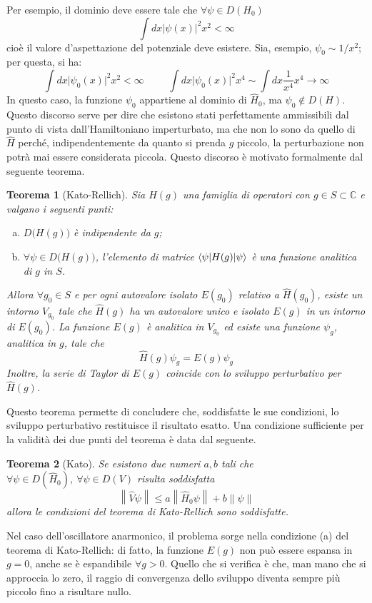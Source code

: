 \documentclass[11pt, a4paper]{scrartcl} %
\numberwithin{equation}{section}
\theoremstyle{style2}
\theoremstyle{style1}
\newtheorem{teorema}{Teorema}[section]
\begin{document}
Per esempio, il dominio deve essere tale che $\forall \psi \in D(H_0)$
\[
\int dx \lvert \psi (x) \rvert ^2 x^2 < \infty
\] 
cio\`e il valore d'aspettazione del potenziale deve esistere.
Sia, esempio, $\psi _0\sim 1 / x^2$; per questa, si ha:
\[
\int dx \lvert \psi _0(x) \rvert ^2 x^2 < \infty \hspace{1cm} \int dx \lvert \psi _0(x) \rvert ^2 x^4 \sim \int dx \frac{1}{x^4} x^4 \to \infty
\] 
In questo caso, la funzione $\psi _0$ appartiene al dominio di $\hat{H}_0$, ma $\psi _0 \not \in D(H)$.
Questo discorso serve per dire che esistono stati perfettamente ammissibili dal punto di vista dall'Hamiltoniano imperturbato, ma che non lo sono da quello di $\hat{H}$ perch\'e, indipendentemente da quanto si prenda $g$ piccolo, la perturbazione non potr\`a mai essere considerata piccola.
Questo discorso \`e motivato formalmente dal seguente teorema.
\begin{teorema}
	[Kato-Rellich]
Sia $H (g) $ una famiglia di operatori con $g \in S \subset  \mathbb{C}$ e valgano i seguenti punti:
\begin{enumerate}[(a).]
	\item $D\big(H(g)\big)$ \`e indipendente da $g$;
	\item $\forall \psi  \in D\big(H(g)\big)$, l'elemento di matrice $\braket{\psi |H(g)|\psi } $ \`e una funzione analitica di $g$ in $S$.
\end{enumerate}
Allora $\forall g_0 \in S$ e per ogni autovalore isolato $E(g_0)$ relativo a $\hat{H}(g_0)$, esiste un intorno $V_{g_0} $ tale che $\hat{H}(g)$ ha un autovalore unico e isolato $E(g)$ in un intorno di $E(g_0)$.
La funzione $E(g)$ \`e analitica in $V_{g_0} $ ed esiste una funzione $\psi _g$, analitica in $g$, tale che
\[
\hat{H}(g) \psi _g = E(g) \psi _g
\] 
Inoltre, la serie di Taylor di $E(g)$ coincide con lo sviluppo perturbativo per $\hat{H}(g)$.
\end{teorema}
Questo teorema permette di concludere che, soddisfatte le sue condizioni, lo sviluppo perturbativo restituisce il risultato esatto.
Una condizione sufficiente per la validit\`a dei due punti del teorema \`e data dal seguente.
\begin{teorema}
	[Kato]
	Se esistono due numeri $a,b$ tali che $\forall \psi \in D(\hat{H}_0), \ \forall \psi \in D(V)$ risulta soddisfatta 
	\begin{equation}
		\left\lVert \hat{V}\psi  \right\rVert \le a \left\lVert \hat{H}_0 \psi  \right\rVert + b \left\lVert \psi  \right\rVert 
	\end{equation}
	allora le condizioni del teorema di Kato-Rellich sono soddisfatte.
\end{teorema}
Nel caso dell'oscillatore anarmonico, il problema sorge nella condizione (a) del teorema di Kato-Rellich: di fatto, la funzione $E(g)$ non pu\`o essere espansa in $g=0$, anche se \`e espandibile $\forall g > 0$.
Quello che si verifica \`e che, man mano che si approccia lo zero, il raggio di convergenza dello sviluppo diventa sempre pi\`u piccolo fino a risultare nullo.
\end{document}
